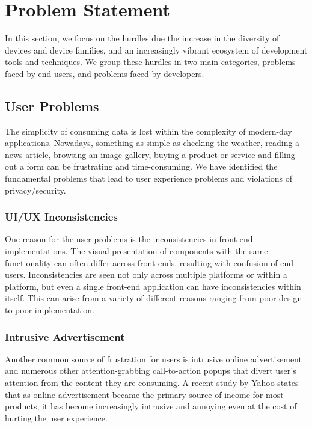 \section{Problem Statement} \label{problemStatement}

In this section, we focus on the hurdles due the increase in the diversity of devices and device families, and an increasingly vibrant ecosystem of development tools and techniques. We group these hurdles in two main categories, problems faced by end users, and problems faced by developers.

\subsection{User Problems}

The simplicity of consuming data is lost within the complexity of modern-day applications. Nowadays, something as simple as checking the weather, reading a news article, browsing an image gallery, buying a product or service and filling out a form can be frustrating and time-consuming. We have identified the fundamental problems that lead to user experience problems and violations of privacy/security.

\subsubsection{UI/UX Inconsistencies}
One reason for the user problems is the inconsistencies in front-end implementations. The visual presentation of components with the same functionality can often differ across front-ends, resulting with confusion of end users. Inconsistencies are seen not only across multiple platforms or within a platform, but even a single front-end application can have inconsistencies within itself. This can arise from a variety of different reasons ranging from poor design to poor implementation.

\subsubsection{Intrusive Advertisement}
Another common source of frustration for users is intrusive online advertisement and numerous other attention-grabbing call-to-action popups that divert user's attention from the content they are consuming. A recent study by Yahoo \cite{IntrusiveAds} states that as online advertisement became the primary source of income for most products, it has become increasingly intrusive and annoying even at the cost of hurting the user experience.

